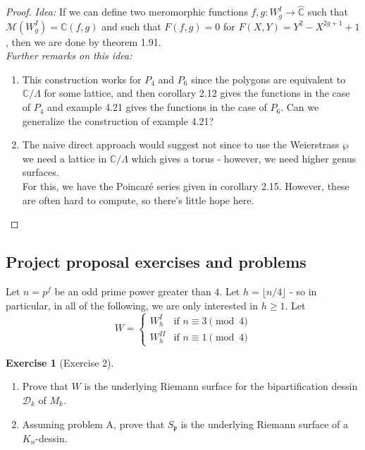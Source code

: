 \documentclass[reqno]{amsart}
\theoremstyle{definition}
\newtheorem{exercise}[theorem]{Exercise}
\theoremstyle{remark}
\begin{document}
    \begin{proof}
        \textit{Idea:} If we can define two meromorphic functions
        $f,g \colon W_g^I \to \hat{\mathbb{C}}$ such that
        $\mathcal{M}(W_g^I) = \mathbb{C}(f,g)$ and such that
        $F(f,g) = 0$ for $F(X,Y) = Y^2 - X^{2g+1} +1$, then
        we are done by theorem 1.91.\\
        \linebreak
        \textit{Further remarks on this idea:}
        \begin{enumerate}
            \item This construction works for $P_4$ and
            $P_6$ since the polygons are equivalent to
            $\mathbb{C} / \Lambda$ for some lattice, and
            then corollary 2.12 gives the functions
            in the case of $P_4$ and example 4.21 gives
            the functions in the case of $P_6$. Can we
            generalize the construction of example 4.21?
            \item The naive direct approach would suggest
            not since to use the Weierstrass $\wp$ we
            need a lattice in $\mathbb{C} / \Lambda$ which
            gives a torus - however, we need higher genus
            surfaces.\\
            For this, we have the Poincaré series given
            in corollary 2.15. However, these are
            often hard to compute, so there's little hope here.
        \end{enumerate}
    \end{proof}

    \subsection{Project proposal exercises and problems}

Let $n = p^f$ be an odd prime power greater than $4$.
Let $h = \lfloor n/4 \rfloor$ - so in particular, in all of the following,
we are only interested in $h \geq 1$.
Let 
\[W = 
\begin{cases}
    W_{h}^I& \text{if }n\equiv 3 \pmod{4}\\
    W_h^{II}& \text{if } n\equiv 1 \pmod{4}
\end{cases}\]




    \begin{exercise}[Exercise 2]
        \begin{enumerate}
            \item Prove that $W$ is the underlying Riemann surface
            for the bipartification dessin $\mathcal{D}_k$ of
            $M_k$.
            \item Assuming problem A, prove that $S_{\mathfrak{p}}$
            is the underlying Riemann surface of a $K_n$-dessin.
        \end{enumerate}
    \end{exercise}
\end{document}
